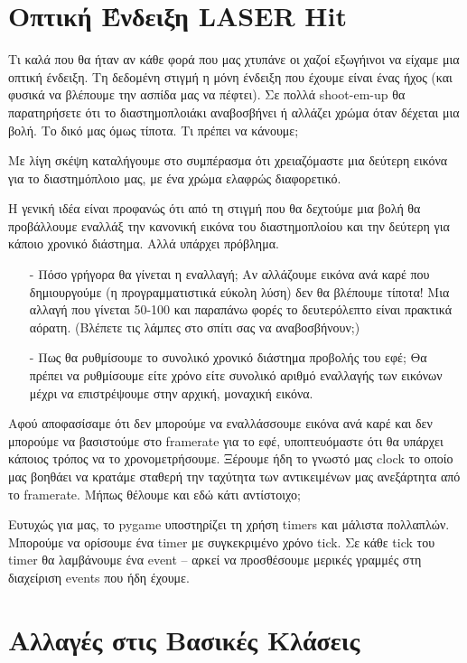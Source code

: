 \section{Οπτική Ένδειξη LASER Hit}

Τι καλά που θα ήταν αν κάθε φορά που μας χτυπάνε οι χαζοί εξωγήινοι να
είχαμε μια οπτική ένδειξη.  Τη δεδομένη στιγμή η μόνη ένδειξη που έχουμε
είναι ένας ήχος (και φυσικά να βλέπουμε την ασπίδα μας να πέφτει). Σε
πολλά shoot-em-up θα παρατηρήσετε ότι το διαστημοπλοιάκι αναβοσβήνει
ή αλλάζει χρώμα όταν δέχεται μια βολή.  Το δικό μας όμως τίποτα. Τι
πρέπει να κάνουμε;

Με λίγη σκέψη καταλήγουμε στο συμπέρασμα ότι
χρειαζόμαστε μια δεύτερη εικόνα για το διαστημόπλοιο μας, με ένα χρώμα
ελαφρώς διαφορετικό. 

Η γενική ιδέα είναι προφανώς ότι από τη στιγμή που θα δεχτούμε μια βολή
θα προβάλλουμε εναλλάξ την κανονική εικόνα του διαστημοπλοίου και την
δεύτερη για κάποιο χρονικό διάστημα. Αλλά υπάρχει πρόβλημα.

\begin{itemize}
\item[-] Πόσο γρήγορα θα γίνεται η εναλλαγή; Αν αλλάζουμε εικόνα ανά καρέ που
      δημιουργούμε (η προγραμματιστικά εύκολη λύση) δεν θα βλέπουμε τίποτα!
	  Μια αλλαγή που γίνεται 50-100 και παραπάνω φορές το δευτερόλεπτο είναι
      πρακτικά αόρατη. (Βλέπετε τις λάμπες στο σπίτι σας να αναβοσβήνουν;)
\item[-] Πως θα ρυθμίσουμε το συνολικό χρονικό διάστημα προβολής του εφέ; Θα
      πρέπει να ρυθμίσουμε είτε χρόνο είτε συνολικό αριθμό εναλλαγής των
	  εικόνων μέχρι να επιστρέψουμε στην αρχική, μοναχική εικόνα.
\end{itemize}

Αφού αποφασίσαμε ότι δεν μπορούμε να εναλλάσσουμε εικόνα ανά καρέ και δεν
μπορούμε να βασιστούμε στο framerate για το εφέ, υποπτευόμαστε ότι θα
υπάρχει κάποιος τρόπος να το χρονομετρήσουμε.  Ξέρουμε ήδη το γνωστό μας
clock το οποίο μας βοηθάει να κρατάμε σταθερή την ταχύτητα των
αντικειμένων μας ανεξάρτητα από το framerate. Μήπως θέλουμε και εδώ
κάτι αντίστοιχο;

Ευτυχώς για μας, το pygame υποστηρίζει τη χρήση timers και μάλιστα πολλαπλών.
Μπορούμε να ορίσουμε ένα timer με συγκεκριμένο χρόνο tick.
Σε κάθε tick του timer θα λαμβάνουμε ένα event -- αρκεί
να προσθέσουμε μερικές γραμμές στη διαχείριση events που ήδη έχουμε.

\section{Αλλαγές στις Βασικές Κλάσεις}

